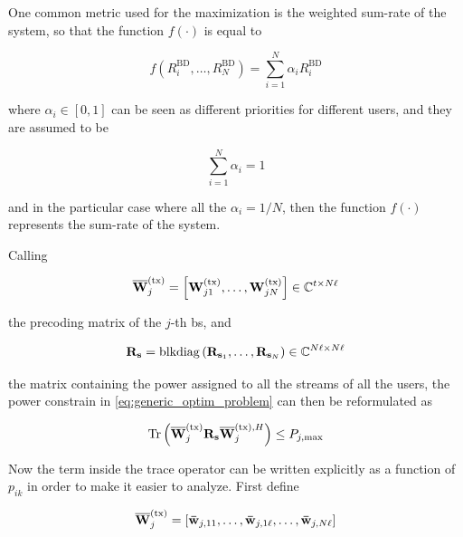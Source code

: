 One common metric used for the maximization is the weighted sum-rate of the
system, so that the function $f\left(\cdot\right)$ is equal to

\begin{equation} \label{eq:weighted_sum_rate}
    f\left(R_i^{\text{BD}}, \ldots, R_N^{\text{BD}}\right) =
    \sum\limits_{i = 1}^{N}\alpha_i R_i^{\text{BD}}
\end{equation}

\noindent
where $\alpha_i \in \left[0, 1\right]$ can be seen as different priorities for
different users, and they are assumed to be

\begin{equation} \label{eq:priorities}
    \sum\limits_{i = 1}^{N}\alpha_i = 1
\end{equation}

\noindent
and in the particular case where all the $\alpha_i = 1/N$, then the function
$f\left(\cdot\right)$ represents the sum-rate of the system.

Calling

\begin{equation} \label{eq:precoding_bs}
	\mathbf{\overline{W}}^{(\text{tx})}_j = \left[\mathbf{W}^{(\text{tx})}_{j1}, \ldots, \mathbf{W}^{(\text{tx})}_{jN}\right] \in \mathbb{C}^{t \times
	N\ell}
\end{equation}

\noindent
the precoding matrix of the $j$-th \gls{bs}, and

\begin{equation} \label{eq:powers_all_users}
	\mathbf{R}_{\mathbf{s}} = \operatorname*{blkdiag} \left(\mathbf{R}_{\mathbf{s}_1}, \ldots, \mathbf{R}_{\mathbf{s}_N}\right) \in
	\mathbb{C}^{N\ell \times N\ell}
\end{equation}

\noindent
the matrix containing the power assigned to all the streams of all the users,
the power constrain in \eqref{eq:generic_optim_problem} can then be reformulated
as

\begin{equation} \label{eq:pbpc_constraint}
	\operatorname*{Tr} \left( \mathbf{\overline{W}}^{(\text{tx})}_j\mathbf{R}_{\mathbf{s}}\mathbf{\overline{W}}^{(\text{tx}),H}_j \right) \leq P_{j,\max}
\end{equation}

Now the term inside the trace operator can be written explicitly as a function
of $p_{ik}$ in order to make it easier to analyze. First define

\begin{equation} \label{eq:precoding_bs_columns}
	\mathbf{\overline{W}}^{(\text{tx})}_j = \left[ \mathbf{\bar{w}}_{j,11}, \ldots, \mathbf{\bar{w}}_{j, 1\ell}, \ldots,
	\mathbf{\bar{w}}_{j,N\ell} \right]
\end{equation}


